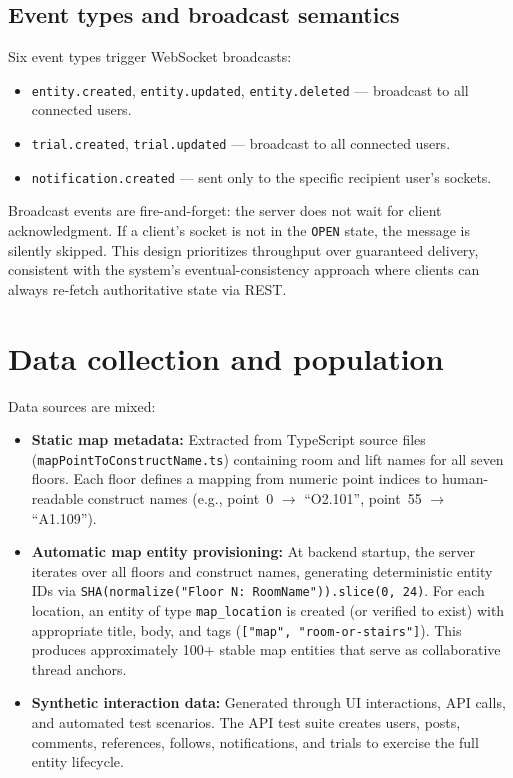 \documentclass[13pt,a4paper]{report}
\begin{document}
\subsection{Event types and broadcast semantics}
Six event types trigger WebSocket broadcasts:
\begin{itemize}
    \item \texttt{entity.created}, \texttt{entity.updated}, \texttt{entity.deleted} --- broadcast to all connected users.
    \item \texttt{trial.created}, \texttt{trial.updated} --- broadcast to all connected users.
    \item \texttt{notification.created} --- sent only to the specific recipient user's sockets.
\end{itemize}

Broadcast events are fire-and-forget: the server does not wait for client acknowledgment. If a client's socket is not in the \texttt{OPEN} state, the message is silently skipped. This design prioritizes throughput over guaranteed delivery, consistent with the system's eventual-consistency approach where clients can always re-fetch authoritative state via REST.

\section{Data collection and population}
Data sources are mixed:
\begin{itemize}
    \item \textbf{Static map metadata:} Extracted from TypeScript source files (\texttt{mapPointToConstructName.ts}) containing room and lift names for all seven floors. Each floor defines a mapping from numeric point indices to human-readable construct names (e.g., point~0 $\to$ ``O2.101'', point~55 $\to$ ``A1.109'').
    \item \textbf{Automatic map entity provisioning:} At backend startup, the server iterates over all floors and construct names, generating deterministic entity IDs via
    \texttt{SHA(\allowbreak normalize("Floor~N:\allowbreak{} RoomName"))\allowbreak.slice(0,~24)}.
    For each location, an entity of type \texttt{map\_location} is created (or verified to exist) with appropriate title, body, and tags (\texttt{["map",\allowbreak{} "room-or-stairs"]}). This produces approximately 100+ stable map entities that serve as collaborative thread anchors.
    \item \textbf{Synthetic interaction data:} Generated through UI interactions, API calls, and automated test scenarios. The API test suite creates users, posts, comments, references, follows, notifications, and trials to exercise the full entity lifecycle.
\end{itemize}
\end{document}
